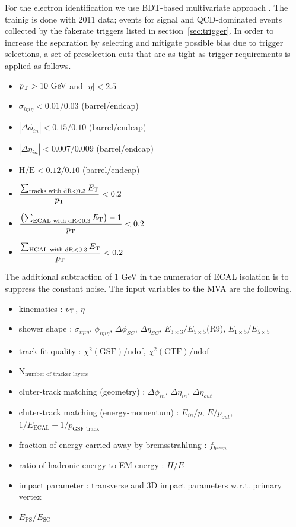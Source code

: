 For the electron identification we use BDT-based multivariate approach \cite{electronBDT}.  
The trainig is done with 2011 data; \dyll{} events for signal and QCD-dominated events 
collected by the fakerate triggers listed in section~\ref{sec:trigger}. 
In order to increase the separation by selecting and mitigate possible bias 
due to trigger selections, a set of preselection cuts that are as tight as trigger 
requirements is applied as follows. 
\begin{itemize}
  \item $p_\mathrm{T}>10~\mathrm{Ge\kern -0.1em V}$ and $|\eta| < 2.5$
  \item $\sigma_{i\eta i\eta} < 0.01/0.03$ (barrel/endcap)
  \item $|\Delta\phi_{in}| < 0.15/0.10$ (barrel/endcap)
  \item $|\Delta\eta_{in}| < 0.007/0.009$ (barrel/endcap)
  \item $\textrm{H/E}< 0.12/0.10$ (barrel/endcap)
  \item $\displaystyle \frac{\sum_{\textrm{tracks with dR}<0.3}E_\mathrm{T}}{p_\mathrm{T}}<0.2$
  \item $\displaystyle \frac{\left(\sum_{\textrm{ECAL with dR}<0.3}E_\mathrm{T}\right)-1}{p_\mathrm{T}}<0.2$
  \item $\displaystyle \frac{\sum_{\textrm{HCAL with dR}<0.3}E_\mathrm{T}}{p_\mathrm{T}}<0.2$
\end{itemize}
The additional subtraction of 1 GeV in the numerator of ECAL isolation is 
to suppress the constant noise. 
The input variables to the MVA are the following.
\begin{itemize}
\item kinematics : $p_\mathrm{T}$,  $\eta$
\item shower shape : $\sigma_{i\eta i\eta}$, $\phi_{i\eta i\eta}$, $\Delta \phi_{SC}$, $\Delta \eta_{SC}$, $E_{3\times3}/E_{5\times5}$(R9), $E_{1\times5}/E_{5\times5}$
\item track fit quality : $\chi^2(\textrm{GSF})/\textrm{ndof} $, $\chi^2(\textrm{CTF})/\textrm{ndof}$ 
\item $\textrm{N}_\textrm{number of tracker layers}$  
\item cluter-track matching (geometry) : $\Delta \phi_{in}$, $\Delta \eta_{in}$, $\Delta \eta_{out}$
\item cluter-track matching (energy-momentum) : $E_{in}/p$, $E/p_{out}$, $1/E_\textrm{ECAL} - 1/p_{\textrm{GSF track}}$ 
\item fraction of energy carried away by bremsstrahlung : $f_{brem}$ 
\item ratio of hadronic energy to EM energy  : $H/E$ 
\item impact parameter :  transverse and 3D impact parameters w.r.t. primary vertex
\item $E_{\textrm{PS}}/E_{\textrm{SC}}$
\end{itemize}
